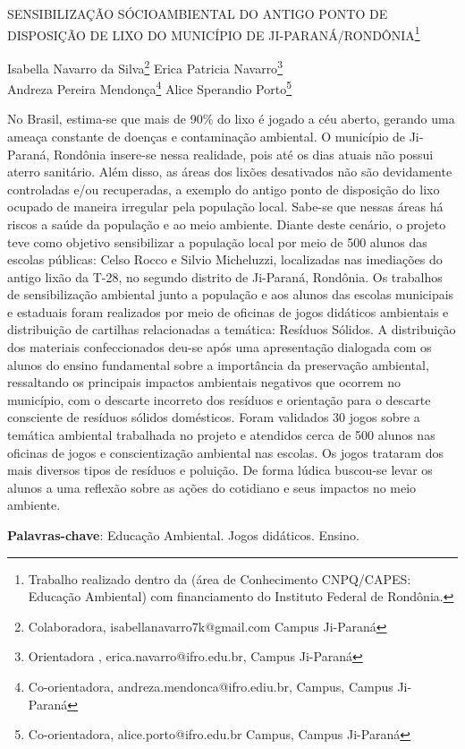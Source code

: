 \documentclass[article,12pt,onesidea,4paper,english,brazil]{abntex2}
\begin{document}
	
	
	\frenchspacing 
	
	\begin{center}
		\LARGE SENSIBILIZAÇÃO SÓCIOAMBIENTAL DO ANTIGO PONTO DE DISPOSIÇÃO DE LIXO DO MUNICÍPIO DE JI-PARANÁ/RONDÔNIA\footnote{Trabalho realizado dentro da (área de Conhecimento CNPQ/CAPES: Educação Ambiental) com financiamento do Instituto Federal de Rondônia.}
		
		\normalsize
		Isabella Navarro da Silva\footnote{Colaboradora, isabellanavarro7k@gmail.com Campus Ji-Paraná} 
		Erica Patricia Navarro\footnote{Orientadora , erica.navarro@ifro.edu.br, Campus Ji-Paraná}  \\
		Andreza Pereira Mendonça\footnote{Co-orientadora, andreza.mendonca@ifro.ediu.br, Campus, Campus Ji-Paraná} 
		Alice Sperandio Porto\footnote{Co-orientadora, alice.porto@ifro.edu.br Campus, Campus Ji-Paraná} 
	\end{center}
	
	\noindent No Brasil, estima-se que mais de 90\% do lixo é jogado a céu aberto, gerando uma ameaça constante de doenças e contaminação ambiental. O município de Ji-Paraná, Rondônia insere-se nessa realidade, pois até os dias atuais não possui aterro sanitário. Além disso, as áreas dos lixões desativados não são devidamente controladas e/ou recuperadas, a exemplo do antigo ponto de disposição do lixo ocupado de maneira irregular pela população local. Sabe-se que nessas áreas há riscos a saúde da população e ao meio ambiente. Diante deste cenário, o projeto teve como objetivo sensibilizar a população local por meio de 500 alunos das escolas públicas: Celso Rocco e Silvio Micheluzzi, localizadas nas imediações do antigo lixão da T-28, no segundo distrito de Ji-Paraná, Rondônia.  Os trabalhos de sensibilização ambiental junto a população e aos alunos das escolas municipais e estaduais foram realizados por meio de oficinas de jogos didáticos ambientais e distribuição de cartilhas relacionadas a temática: Resíduos Sólidos. A distribuição dos materiais confeccionados deu-se após uma apresentação dialogada com os alunos do ensino fundamental sobre a importância da preservação ambiental, ressaltando os principais impactos ambientais negativos que ocorrem no município, com o descarte incorreto dos resíduos e orientação para o descarte consciente de resíduos sólidos domésticos. Foram validados 30 jogos sobre a temática ambiental trabalhada no projeto e atendidos cerca de 500 alunos nas oficinas de jogos e conscientização ambiental nas escolas. Os jogos trataram dos mais diversos tipos de resíduos e poluição. De forma lúdica buscou-se levar os alunos a uma reflexão sobre as ações do cotidiano e seus impactos no meio ambiente.
	
	\vspace{\onelineskip}
	
	\noindent
	\textbf{Palavras-chave}: Educação Ambiental. Jogos didáticos. Ensino.
	
\end{document}

